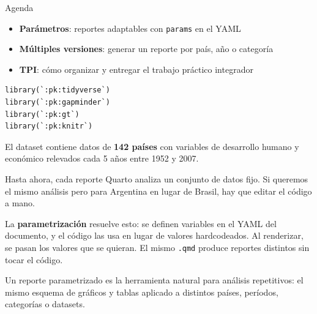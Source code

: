 \documentclass[8pt]{beamer}
\begin{document}
	\subtitle{13mo encuentro: Quarto III}

	\begin{frame}[plain]
		\maketitle
	\end{frame}


	\begin{frame}[fragile]{Agenda}
		\begin{itemize}
			\item \textbf{Parámetros}: reportes adaptables con \texttt{params} en el YAML
			\item \textbf{Múltiples versiones}: generar un reporte por país, año o categoría
			\item \textbf{TPI}: cómo organizar y entregar el trabajo práctico integrador
		\end{itemize}


\begin{lstlisting}[style=RScript]
library(`:pk:tidyverse`)
library(`:pk:gapminder`)
library(`:pk:gt`)
library(`:pk:knitr`)
\end{lstlisting}

		\begin{block}{}
			El dataset  contiene datos de \textbf{142 países} con variables de desarrollo humano y económico relevados cada 5 años entre 1952 y 2007.
		\end{block}
	\end{frame}


	\begin{frame}
		Hasta ahora, cada reporte Quarto analiza un conjunto de datos fijo. Si queremos el mismo análisis pero para Argentina en lugar de Brasil, hay que editar el código a mano.

		La \textbf{parametrización} resuelve esto: se definen variables en el YAML del documento, y el código las usa en lugar de valores hardcodeados. Al renderizar, se pasan los valores que se quieran. El mismo \texttt{.qmd} produce reportes distintos sin tocar el código.

		\begin{exampleblock}{}
			Un reporte parametrizado es la herramienta natural para análisis repetitivos: el mismo esquema de gráficos y tablas aplicado a distintos países, períodos, categorías o datasets.
		\end{exampleblock}
	\end{frame}
\end{document}
